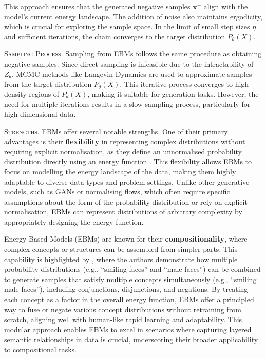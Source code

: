 This approach ensures that the generated negative samples \(\mathbf{x}^-\) align with the model's current energy landscape. The addition of noise also maintains ergodicity, which is crucial for exploring the sample space. In the limit of small step sizes \(\eta\) and sufficient iterations, the chain converges to the target distribution \(P_\theta(X)\).

\textsc{Sampling Process.} Sampling from EBMs follows the same procedure as obtaining negative samples. Since direct sampling is infeasible due to the intractability of \( Z_\theta \), MCMC methods like Langevin Dynamics are used to approximate samples from the target distribution \( P_\theta(X) \). This iterative process converges to high-density regions of \( P_\theta(X) \), making it suitable for generation tasks. However, the need for multiple iterations results in a slow sampling process, particularly for high-dimensional data.

\textsc{Strengths.} EBMs offer several notable strengths. One of their primary advantages is their \textbf{flexibility} in representing complex distributions without requiring explicit normalisation, as they define an unnormalised probability distribution directly using an energy function \cite{lecun2006tutorial}. This flexibility allows EBMs to focus on modelling the energy landscape of the data, making them highly adaptable to diverse data types and problem settings. Unlike other generative models, such as GANs or normalising flows, which often require specific assumptions about the form of the probability distribution or rely on explicit normalisation, EBMs can represent distributions of arbitrary complexity by appropriately designing the energy function.

Energy-Based Models (EBMs) are known for their \textbf{compositionality}, where complex concepts or structures can be assembled from simpler parts. This capability is highlighted by \citet{du2020compositional}, where the authors demonstrate how multiple probability distributions (e.g., ``smiling faces'' and ``male faces'') can be combined to generate samples that satisfy multiple concepts simultaneously (e.g., ``smiling male faces''), including conjunctions, disjunctions, and negations. By treating each concept as a factor in the overall energy function, EBMs offer a principled way to fuse or negate various concept distributions without retraining from scratch, aligning well with human-like rapid learning and adaptability. This modular approach enables EBMs to excel in scenarios where capturing layered semantic relationships in data is crucial, underscoring their broader applicability to compositional tasks.


